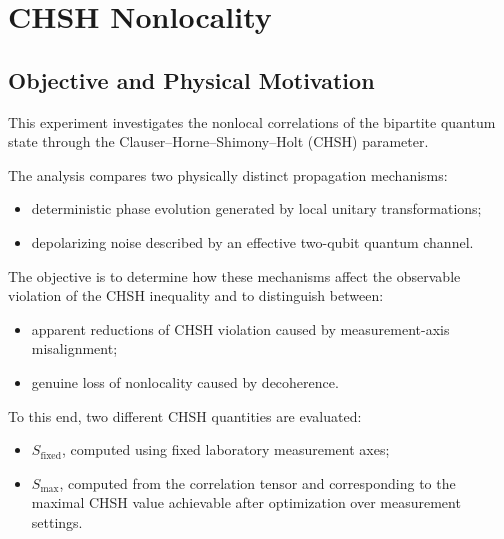
\section{CHSH Nonlocality}


\subsection{Objective and Physical Motivation}

This experiment investigates the nonlocal correlations of the bipartite quantum state through the Clauser--Horne--Shimony--Holt (CHSH) parameter.

The analysis compares two physically distinct propagation mechanisms:

\begin{itemize}
    \item deterministic phase evolution generated by local unitary transformations;
    \item depolarizing noise described by an effective two-qubit quantum channel.
\end{itemize}

The objective is to determine how these mechanisms affect the observable violation of the CHSH inequality and to distinguish between:

\begin{itemize}
    \item apparent reductions of CHSH violation caused by measurement-axis misalignment;
    \item genuine loss of nonlocality caused by decoherence.
\end{itemize}

To this end, two different CHSH quantities are evaluated:

\begin{itemize}
    \item \(S_{\mathrm{fixed}}\), computed using fixed laboratory measurement axes;
    \item \(S_{\max}\), computed from the correlation tensor and corresponding to the maximal CHSH value achievable after optimization over measurement settings.
\end{itemize}

